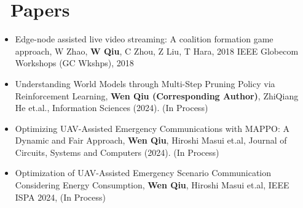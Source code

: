 \documentclass{resume}
\begin{document}
\section{\faCogs\ Papers}
\begin{itemize}[parsep=0.5ex]
  \item Edge-node assisted live video streaming: A coalition formation game approach, W Zhao, \textbf{W Qiu}, C Zhou, Z Liu, T Hara, 2018 IEEE Globecom Workshops (GC Wkshps), 2018
  \item Understanding World Models through Multi-Step Pruning Policy via Reinforcement Learning, \textbf{Wen Qiu (Corresponding Author)}, ZhiQiang He et.al., Information Sciences (2024). (In Process)
  \item Optimizing UAV-Assisted Emergency Communications with MAPPO: A Dynamic and Fair Approach, \textbf{Wen Qiu}, Hiroshi Masui et.al, Journal of Circuits, Systems and Computers (2024). (In Process)
  \item Optimization of UAV-Assisted Emergency Scenario Communication Considering Energy Consumption, \textbf{Wen Qiu}, Hiroshi Masui et.al, IEEE ISPA 2024, (In Process)
\end{itemize}

\end{document}
